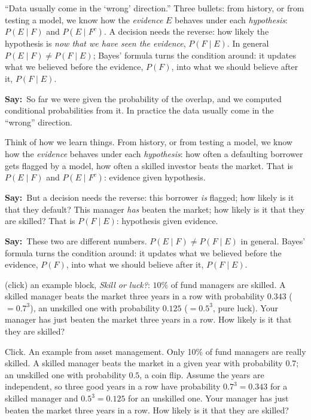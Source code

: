 \documentclass[11pt,a4paper,parskip=half]{scrartcl}
\newcommand{\say}{\textbf{\color{teal}Say:}\ }
\begin{document}
\begin{onslide}
	``Data usually come in the `wrong' direction.'' Three bullets: from
	history, or from testing a model, we know how the \emph{evidence} $E$
	behaves under each \emph{hypothesis}: $P(E\mid F)$ and $P(E\mid F^c)$.
	A decision needs the reverse: how likely the hypothesis is \emph{now
		that we have seen the evidence}, $P(F\mid E)$. In general
	$P(E\mid F)\neq P(F\mid E)$; Bayes' formula turns the condition around:
	it updates what we believed before the evidence, $P(F)$, into what we
	should believe after it, $P(F\mid E)$.
\end{onslide}

\say So far we were given the probability of the overlap, and we
computed conditional probabilities from it. In practice the data usually
come in the ``wrong'' direction.

Think of how we learn things. From history, or from testing a model, we
know how the \emph{evidence} behaves under each \emph{hypothesis}: how
often a defaulting borrower gets flagged by a model, how often a skilled
investor beats the market. That is $P(E\mid F)$ and $P(E\mid F^c)$:
evidence given hypothesis.

\say But a decision needs the reverse: this borrower \emph{is} flagged;
how likely is it that they default? This manager \emph{has} beaten the
market; how likely is it that they are skilled? That is $P(F\mid E)$:
hypothesis given evidence.

\say These two are different numbers. $P(E\mid F)\ne P(F\mid E)$ in
general. Bayes' formula turns the condition around: it updates what we
believed before the evidence, $P(F)$, into what we should believe after
it, $P(F\mid E)$.

\begin{onslide}
	(click) an example block, \emph{Skill or luck?}: $10\%$ of fund
	managers are skilled. A skilled manager beats the market three years in
	a row with probability $0.343$ ($=0.7^3$), an unskilled one with
	probability $0.125$ ($=0.5^3$, pure luck). Your manager has just beaten
	the market three years in a row. How likely is it that they are
	skilled?
\end{onslide}

Click. An example from asset management. Only 10\% of fund managers are
really skilled. A skilled manager beats the market in a given year with
probability $0.7$; an unskilled one with probability $0.5$, a coin flip.
Assume the years are independent, so three good years in a row have
probability $0.7^3=0.343$ for a skilled manager and $0.5^3=0.125$ for an
unskilled one. Your manager has just beaten the market three years in a
row. How likely is it that they are skilled?
\end{document}
